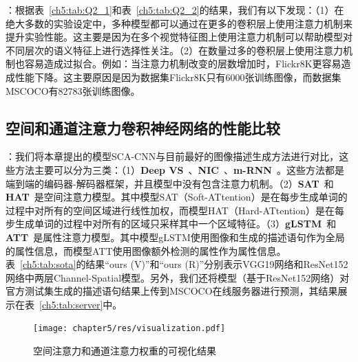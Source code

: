 
\textbf{}：根据表~\ref{ch5:tab:Q2_1}和表~\ref{ch5:tab:Q2_2}的结果，我们有以下发现：（1）在绝大多数的实验设定中，多种模型都可以通过在更多的卷积层上使用注意力机制来提升实验性能。这主要是因为在多个视觉特征图上使用注意力机制可以帮助模型对不同层次的语义特征上进行选择性关注。（2）在数量过多的卷积层上使用注意力机制也容易造成过拟合。例如：当注意力机制改变的层数增加时，Flickr8K更容易造成性能下降。这主要原因是因为数据集Flickr8K只有6000张训练图像，而数据集MSCOCO有82783张训练图像。


\subsection{空间和通道注意力卷积神经网络的性能比较}

\textbf{}：我们将本章提出的模型SCA-CNN与目前最好的图像描述生成方法进行对比，这些方法主要可以分为三类：（1）\textbf{Deep VS}~\cite{karpathy2015deep}、\textbf{NIC}~\cite{vinyals2015show}、\textbf{m-RNN}~\cite{mao2015deep}。这些方法都是端到端的编码器-解码器框架，并且模型中没有包含注意力机制。（2）\textbf{SAT}~\cite{xu2015show}和\textbf{HAT}~\cite{xu2015show}是空间注意力模型。其中模型SAT（Soft-ATtention）是在每步生成单词的过程中对所有的空间区域进行线性加权，而模型HAT（Hard-ATtention）是在每步生成单词的过程中对所有的区域只采样其中一个区域特征。（3）\textbf{gLSTM}~\cite{jia2015guiding}和\textbf{ATT}~\cite{you2016image}是属性注意力模型。其中模型gLSTM使用图像和生成的描述语句作为全局的属性信息，而模型ATT使用图像额外检测的属性作为属性信息。表~\ref{ch5:tab:sota}的结果“ours (V)”和“ours (R)”分别表示VGG19网络和ResNet152网络中两层Channel-Spatial模型。另外，我们还将模型（基于ResNet152网络）对官方测试集生成的描述语句结果上传到MSCOCO在线服务器进行预测，其结果展示在表~\ref{ch5:tab:server}中。

\begin{figure}[t]
    \centering
    \texttt{[image: chapter5/res/visualization.pdf]}
    \caption{空间注意力和通道注意力权重的可视化结果}
    \label{ch5:fig:visualization}
\end{figure}

